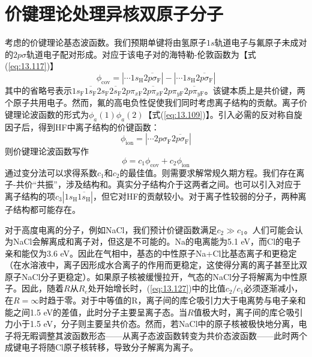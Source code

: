 \section{价键理论处理异核双原子分子}
\label{sec:13.16 VB Treatment of Heteronuclear Diatomic Molecules}

    考虑的价键理论基态波函数。我们预期单键将由氢原子$1s$轨道电子与氟原子未成对的$2p\sigma$轨道电子配对形成。对应于该电子对的海特勒-伦敦函数为【式(\ref{eq:13.117})】
    \begin{equation}
        \phi_{\text{cov}} = \left|\cdots 1s_{\text{H}}\overline{2p\sigma_{\text{F}}}\right| - \left|\cdots 1s_{\text{H}}\overline{2p\sigma_{\text{F}}}\right|
        \label{eq:13.126}
    \end{equation}
    其中的省略号表示$1s_{\mathrm{F}} \overline{1s_{\mathrm{F}}} 2s_{\mathrm{F}} \overline{2s_{\mathrm{F}}} 2p\pi_{x{\mathrm{F}}} \overline{2p\pi_{x{\mathrm{F}}}} 2p\pi_{y{\mathrm{F}}} \overline{2p\pi_{y\mathrm{F}}}$。该键本质上是共价键，两个原子共用电子。然而，氟的高电负性促使我们同时考虑离子结构的贡献。离子价键理论波函数的形式为$\phi_a\left(1\right)\phi_a\left(2\right)$【式(\ref{eq:13.109})】。引入必需的反对称自旋因子后，得到HF中离子结构的价键函数：
    \begin{equation*}
        \phi_{\text{ion}} = \left|\cdots 2p\sigma_{\mathrm{F}}\overline{2p\sigma_{\mathrm{F}}}\right|
    \end{equation*}
    则价键理论波函数写作
    \begin{equation}
        \phi = c_1\phi_{\text{cov}} + c_2\phi_{\text{ion}}
        \label{eq:13.127}
    \end{equation}
    通过变分法可以求得系数$c_1$和$c_2$的最佳值。则需要求解常规久期方程。我们存在离子-共价“共振”，涉及结构和。真实分子结构介于这两者之间。也可以引入对应于离子结构的项$c_3\left|1s_{\mathrm{H}}\overline{1s_{\mathrm{H}}}\right|$，但它对HF的贡献较小。对于离子性较弱的分子，两种离子结构都可能存在。

    对于高度电离的分子，例如NaCl，我们预计价键函数满足$c_2 \gg c_1$。人们可能会认为NaCl会解离成和离子对，但这是不可能的。Na的电离能为5.1 eV，而Cl的电子亲和能仅为3.6 eV。因此在气相中，基态的中性原子Na+Cl比基态离子和更稳定（在水溶液中，离子因形成水合离子的作用而更稳定，这使得分离的离子甚至比双原子NaCl分子更稳定）。如果原子核被缓慢拉开，气态的NaCl分子将解离为中性原子。因此，随着$R$从$R_e$处开始增长时，(\ref{eq:13.127})中的比值$c_2/c_1$必须逐渐减小，在$R = \infty$时趋于零。对于中等值的R，离子间的库仑吸引力大于电离势与电子亲和能之间1.5 eV的差值，此时分子主要呈离子态。当$R$值极大时，离子间的库仑吸引力小于1.5 eV，分子则主要呈共价态。然而，若NaCl中的原子核被极快地分离，电子将无暇调整其波函数形态——从离子态波函数转变为共价态波函数——此时两个成键电子将随Cl原子核转移，导致分子解离为离子。

